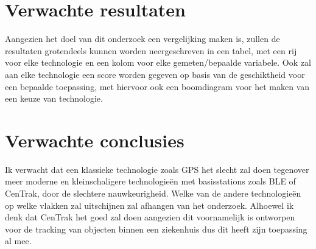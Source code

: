 \section{Verwachte resultaten}
\label{sec:verwachte_resultaten}

Aangezien het doel van dit onderzoek een vergelijking maken is, zullen de resultaten grotendeels kunnen worden neergeschreven in een tabel, met een rij voor elke technologie en een kolom voor elke gemeten/bepaalde variabele. Ook zal aan elke technologie een score worden gegeven op basis van de geschiktheid voor een bepaalde toepassing, met hiervoor ook een boomdiagram voor het maken van een keuze van technologie.

\section{Verwachte conclusies}
\label{sec:verwachte_conclusies}

Ik verwacht dat een klassieke technologie zoals GPS het slecht zal doen tegenover meer moderne en kleinschaligere technologieën met basisstations zoals BLE of CenTrak, door de slechtere nauwkeurigheid. Welke van de andere technologieën op welke vlakken zal uitschijnen zal afhangen van het onderzoek. Alhoewel ik denk dat CenTrak het goed zal doen aangezien dit voornamelijk is ontworpen voor de tracking van objecten binnen een ziekenhuis dus dit heeft zijn toepassing al mee.